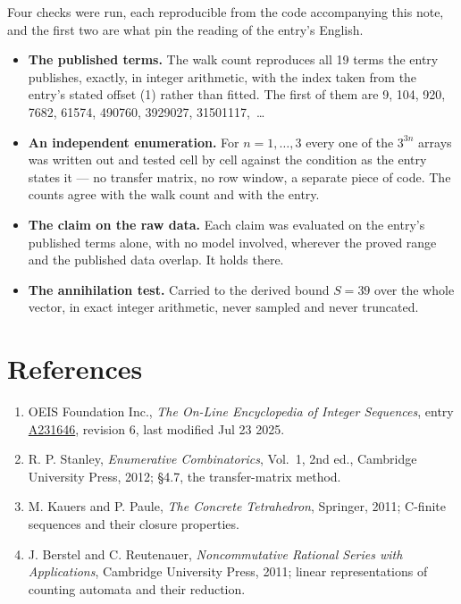 \documentclass[11pt]{article}
\theoremstyle{definition}
\begin{document}
Four checks were run, each reproducible from the code accompanying this note, and the first two are what pin the reading of the entry's English.

\begin{itemize}

\item {\bfseries The published terms.} The walk count reproduces all 19 terms the entry publishes, exactly, in integer arithmetic, with the index taken from the entry's stated offset (1) rather than fitted. The first of them are 9, 104, 920, 7682, 61574, 490760, 3929027, 31501117,~\dots

\item {\bfseries An independent enumeration.} For $n = 1,\dots,3$ every one of the $3^{3n}$ arrays was written out and tested cell by cell against the condition as the entry states it --- no transfer matrix, no row window, a separate piece of code. The counts agree with the walk count and with the entry.

\item {\bfseries The claim on the raw data.} Each claim was evaluated on the entry's published terms alone, with no model involved, wherever the proved range and the published data overlap. It holds there.

\item {\bfseries The annihilation test.} Carried to the derived bound $S = 39$ over the whole vector, in exact integer arithmetic, never sampled and never truncated.

\end{itemize}

\section{References}

\begin{enumerate}

\item OEIS Foundation Inc., \emph{The On-Line Encyclopedia of Integer Sequences}, entry \href{https://oeis.org/A231646}{A231646}, revision 6, last modified Jul 23 2025.

\item R. P. Stanley, \emph{Enumerative Combinatorics}, Vol.~1, 2nd ed., Cambridge University Press, 2012; \S4.7, the transfer-matrix method.

\item M. Kauers and P. Paule, \emph{The Concrete Tetrahedron}, Springer, 2011; C-finite sequences and their closure properties.

\item J. Berstel and C. Reutenauer, \emph{Noncommutative Rational Series with Applications}, Cambridge University Press, 2011; linear representations of counting automata and their reduction.

\end{enumerate}
\end{document}
